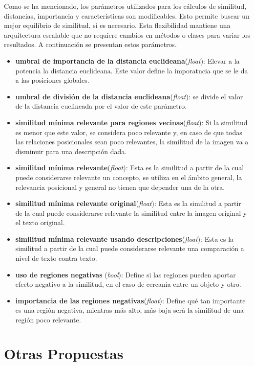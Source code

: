 Como se ha mencionado, los parámetros utilizados para los cálculos de similitud, distancias, importancia y características son modificables. Esto permite buscar un mejor equilibrio de similitud, si es necesario. Esta flexibilidad mantiene una arquitectura escalable que no requiere cambios en métodos o clases para variar los resultados. A continuación se presentan estos parámetros.
\begin{itemize}
    \item \textbf{umbral de importancia de la distancia euclideana}(\textit{float}): Elevar a la potencia la distancia euclideana. Este valor define la imporatncia que se le da a las posiciones globales.
    \item \textbf{umbral de divisi\'on de la distancia euclideana}(\textit{float}): se divide el valor de la distancia euclineada por el valor de este par\'ametro.
    \item \textbf{similitud m\'inima relevante para regiones vecinas}(\textit{float}): Si la similitud es menor que este valor, se considera poco relevante y, en caso de que todas las relaciones posicionales sean poco relevantes, la similitud de la imagen va a disminuir para una descripci\'on dada.
    \item \textbf{similitud m\'inima relevante}(\textit{float}): Esta es la similitud a partir de la cual puede considerarse relevante un concepto, se utiliza en el \'ambito general, la relevancia posicional y general no tienen que depender una de la otra.
    \item \textbf{similitud m\'inima relevante original}(\textit{float}): Esta es la similitud a partir de la cual puede considerarse relevante la similitud entre la imagen original y el texto original.
    \item \textbf{similitud m\'inima relevante usando descripciones}(\textit{float}): Esta es la similitud a partir de la cual puede considerarse relevante una comparación a nivel de texto contra texto. 
    \item \textbf{uso de regiones negativas} (\textit{bool}): Define si las regiones pueden aportar efecto negativo a la similitud, en el caso de cercan\'ia entre un objeto y otro.
    \item \textbf{importancia de las regiones negativas}(\textit{float}): Define qu\'e tan importante es una regi\'on negativa, mientras m\'as alto, m\'as baja ser\'a la similitud de una regi\'on poco relevante.
\end{itemize}

\section{Otras Propuestas}

